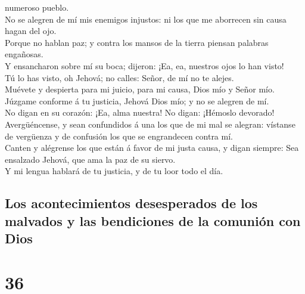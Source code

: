 numeroso pueblo.\\
 No se alegren de mí mis enemigos injustos: ni los que me
aborrecen sin causa hagan del ojo.\\
 Porque no hablan paz; y contra los mansos de la tierra
piensan palabras engañosas.\\
 Y ensancharon sobre mí su boca; dijeron: ¡Ea, ea, nuestros
ojos lo han visto!\\
 Tú lo has visto, oh Jehová; no calles: Señor, de mí no te
alejes.\\
 Muévete y despierta para mi juicio, para mi causa, Dios
mío y Señor mío.\\
 Júzgame conforme á tu justicia, Jehová Dios mío; y no se
alegren de mí.\\
 No digan en su corazón: ¡Ea, alma nuestra! No digan:
¡Hémoslo devorado!\\
 Avergüéncense, y sean confundidos á una los que de mi mal
se alegran: vístanse de vergüenza y de confusión los que se engrandecen
contra mí.\\
 Canten y alégrense los que están á favor de mi justa
causa, y digan siempre: Sea ensalzado Jehová, que ama la paz de su
siervo.\\
 Y mi lengua hablará de tu justicia, y de tu loor todo el
día.

\hypertarget{los-acontecimientos-desesperados-de-los-malvados-y-las-bendiciones-de-la-comuniuxf3n-con-dios}{%
\subsection{Los acontecimientos desesperados de los malvados y las
bendiciones de la comunión con
Dios}\label{los-acontecimientos-desesperados-de-los-malvados-y-las-bendiciones-de-la-comuniuxf3n-con-dios}}

\hypertarget{section-35}{%
\section{36}\label{section-35}}

